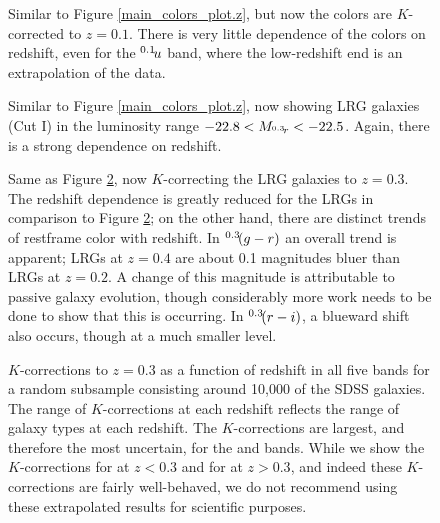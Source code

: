 \clearpage
{}
\begin{figure}
\figurenum{\fignum}
\caption{\label{main_colors_plot} Similar to Figure
\ref{main_colors_plot.z}, but now the colors are $K$-corrected to
$z=0.1$.  There is very little dependence of the colors on redshift,
even for the $^{{0.1}}\!{u}$ band, where the low-redshift end is an
extrapolation of the data.}
\end{figure}

\clearpage
{}
\begin{figure}
\figurenum{\fignum}
\caption{\label{lrg_colors_plot.z} Similar to Figure
\ref{main_colors_plot.z}, now showing LRG galaxies (Cut I) in the
luminosity range $-22.8<M_{^{{0.3}}\!{r}}<-22.5$. Again, there is a
strong dependence on redshift.}
\end{figure}

\clearpage
{}
\begin{figure}
\figurenum{\fignum}
\caption{\label{lrg_colors_plot} Same as Figure
\ref{lrg_colors_plot.z}, now $K$-correcting the LRG galaxies to
$z=0.3$.  The redshift dependence is greatly reduced for the LRGs in
comparison to Figure \ref{lrg_colors_plot.z}; on the other hand, there
are distinct trends of restframe color with redshift.  In
$^{{0.3}}\!{(g-r)}$ an overall trend is apparent; LRGs at $z=0.4$ are
about 0.1 magnitudes bluer than LRGs at $z=0.2$. A change of this
magnitude is attributable to passive galaxy evolution, though
considerably more work needs to be done to show that this is
occurring. In $^{{0.3}}\!{(r-i)}$, a blueward shift also occurs,
though at a much smaller level.}
\end{figure}

\clearpage
{}
\begin{figure}
\figurenum{\fignum}
\caption{\label{k_kcorrect_plot} $K$-corrections to $z=0.3$ as a
function of redshift in all five bands for a random subsample
consisting around 10,000 of the SDSS galaxies.  The range of
$K$-corrections at each redshift reflects the range of galaxy types at
each redshift.  The $K$-corrections are largest, and therefore the
most uncertain, for the  and  bands. While
we show the $K$-corrections for  at $z<0.3$ and for
 at $z>0.3$, and indeed these $K$-corrections are fairly
well-behaved, we do not recommend using these extrapolated results for
scientific purposes. }
\end{figure}

